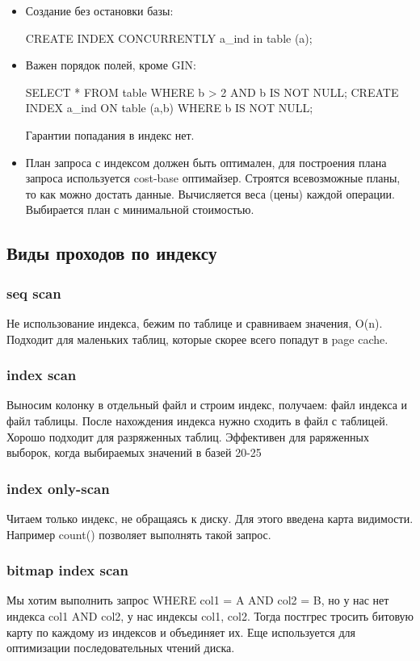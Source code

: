 \begin{itemize}
\item Создание без остановки базы:
\begin{python}
CREATE INDEX CONCURRENTLY a\_ind in table (a);
\end{python}
\item Важен порядок полей, кроме GIN:
\begin{python}
SELECT * FROM table WHERE b > 2 AND b IS NOT NULL;
CREATE INDEX a_ind ON table (a,b) WHERE b IS NOT NULL;
\end{python}
Гарантии попадания в индекс нет.
\item План запроса с индексом должен быть оптимален, для построения плана запроса используется cost-base оптимайзер. Строятся всевозможные планы, то как можно достать данные. Вычисляется веса (цены) каждой операции. Выбирается план с минимальной стоимостью.
\end{itemize}

\subsection{Виды проходов по индексу}

\subsubsection{seq scan}
Не использование индекса, бежим по таблице и сравниваем значения, O(n). Подходит для маленьких таблиц, которые скорее всего попадут в page cache.
\subsubsection{index scan}
Выносим колонку в отдельный файл и строим индекс, получаем: файл индекса и файл таблицы. После нахождения индекса нужно сходить в файл с таблицей. Хорошо подходит для разряженных таблиц. Эффективен для раряженных выборок, когда выбираемых значений в базей 20-25%
\subsubsection{index only-scan}
Читаем только индекс, не обращаясь к диску. Для этого введена карта видимости. Например count() позволяет выполнять такой запрос.
\subsubsection{bitmap index scan}
Мы хотим выполнить запрос WHERE col1 = A AND col2 = B, но у нас нет индекса col1 AND col2, у нас индексы col1, col2. Тогда постгрес тросить битовую карту по каждому из индексов и объединяет их.
Еще используется для оптимизации последовательных чтений диска.

